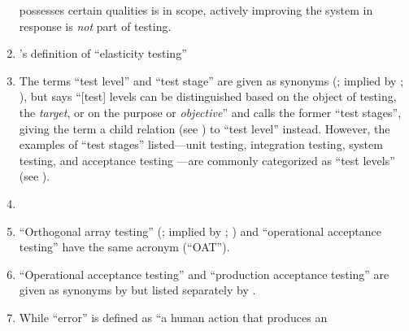 \begin{enumerate}
          possesses certain qualities is in scope, actively improving the
          system in response is \emph{not} part of testing.
    \item %
          \citet[p.~5\=/9]{SWEBOK2024}'s definition of
          ``elasticity testing'' \swebokElasRef{}
    \item %
          The terms ``test level'' and ``test stage'' are given as synonyms
          (\citealpISTQB{}; implied by \citealp[p.~9]{IEEE2015};
          \citealp[p.~9]{Gerrard2000a}), but
          \citet[p.~5\=/6]{SWEBOK2024} says ``[test] levels can be distinguished
          based on the object of testing, the \emph{target}, or on the purpose
          or \emph{objective}'' and calls the former ``test stages'', giving
          the term a child relation (see ) to ``test level''
          instead. However, the examples of ``test stages'' listed---unit
          testing, integration testing, system testing, and acceptance testing
          \citep[pp.~5\=/6 to 5\=/7]{SWEBOK2024}---are commonly categorized as
          ``test levels'' (see ).
    \item %
          \tolTestFlaw{}
    \item %
          ``Orthogonal array testing'' (\citealp[pp.~5\=/1, 5\=/11]{SWEBOK2024};
          implied by \citealp[pp.~467, 473]{Valcheva2013};
          \citealp[pp.~1573\==1577, 1580]{YuEtAl2011}) and ``operational
          acceptance testing'' \citep[p.~30]{Firesmith2015} have the same
          acronym (``OAT'').
    \item %
          ``Operational acceptance testing'' and ``production acceptance
          testing'' are given as synonyms by \citetISTQB{} but listed
          separately by \citet[p.~30]{Firesmith2015}.
    \item %
          While ``error'' is defined as ``a human action that produces an

\end{enumerate}
